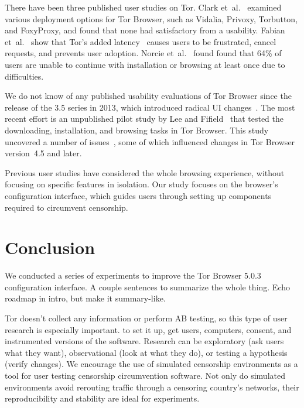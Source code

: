 \documentclass[USenglish,oneside,twocolumn]{article}
\begin{document}
{\color {red} 
There have been three published user studies on Tor. Clark et~al.~\cite{clark2007usability} examined various deployment
options for Tor Browser, such as Vidalia, Privoxy, Torbutton, and FoxyProxy, and found that none had satisfactory from a usability. Fabian et~al.~\cite{fabian2010privately} show that Tor's added
latency~\cite{dingledine2009performance} causes users
to be frustrated, cancel requests, and prevents user adoption. 
Norcie et~al.~\cite{norcie2012eliminating} found found that 
64\% of users are unable to continue with installation or browsing at least once due to difficulties.

We do not know of any published usability evaluations of
Tor Browser since the release of the 3.5 series in 2013, which introduced radical UI changes~\cite{torbrowser-35}.
The most recent effort is an unpublished pilot study by Lee and Fifield~\cite{uxsprint} 
that tested the downloading, installation, and browsing tasks in Tor Browser.  This study uncovered a number of issues~\cite{uxsprint2015-tickets},
some of which influenced changes in Tor Browser version~4.5 and later.

Previous user studies have considered the whole browsing experience,
without focusing on specific features in isolation.
Our study focuses on 
the browser's configuration interface, which guides users through setting up components required to circumvent censorship. 
}

\section{Conclusion} 
\label{sec:conclusion}

{\color {blue}
We conducted a series of experiments to improve the Tor Browser 5.0.3 configuration interface. A couple sentences to summarize the whole thing. Echo roadmap in intro, but make it summary-like. 

Tor doesn't collect any information or perform AB testing, so this type of user research is especially important. to set it up, get users, computers, consent, and instrumented versions of the software. Research can be exploratory (ask users what they want), observational (look at what they do), or testing a hypothesis (verify changes). We encourage the use of simulated censorship environments as a tool for user testing censorship circumvention software. Not only do simulated environments avoid rerouting traffic through a censoring country's networks, their reproducibility and stability are ideal for experiments. 
}
\end{document}
